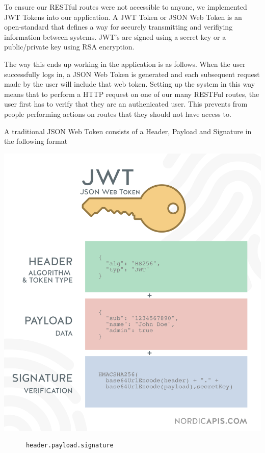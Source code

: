     To ensure our RESTful routes were not accessible to anyone, we implemented JWT Tokens into our application. A JWT Token or JSON Web Token is an open-standard that defines a way for securely transmitting and verifiying information between systems.
    JWT's are signed using a secret key or a public/private key using RSA encryption.
    
    The way this ends up working in the application is as follows. When the user successfully logs in, a JSON Web Token is generated and each subsequent request
    made by the user will include that web token. Setting up the system in this way means that to perform a HTTP request on one of our many RESTFul routes, the user first has to 
    verify that they are an authenicated user. This prevents from people performing actions on routes that they should not have access to. 

    A traditional JSON Web Token consists of a Header, Payload and Signature in the following format 
    
    \begin{center}    
      \includegraphics{img/JWTTokens.png}
    \end{center}

    \begin{verbatim}
      header.payload.signature
    \end{verbatim}

